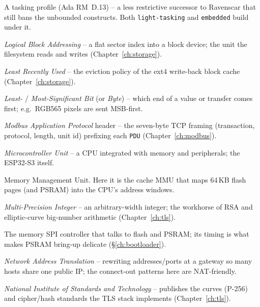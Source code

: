 \begin{description}[style=nextline, leftmargin=0pt]
\item[Jorvik] A tasking profile (Ada RM~D.13) -- a less restrictive successor to
  Ravenscar that still bans the unbounded constructs. Both \texttt{light-tasking}
  and \texttt{embedded} build under it.

\item[LBA] \emph{Logical Block Addressing} -- a flat sector index into a block device; the unit the filesystem reads and writes (Chapter~\ref{ch:storage}).

\item[LRU] \emph{Least Recently Used} -- the eviction policy of the ext4 write-back block cache (Chapter~\ref{ch:storage}).

\item[LSB / MSB] \emph{Least-} / \emph{Most-Significant Bit} (or \emph{Byte}) -- which end of a value or transfer comes first; e.g.\ RGB565 pixels are sent MSB-first.

\item[MBAP] \emph{Modbus Application Protocol} header -- the seven-byte TCP framing (transaction, protocol, length, unit id) prefixing each \texttt{PDU} (Chapter~\ref{ch:modbus}).

\item[MCU] \emph{Microcontroller Unit} -- a CPU integrated with memory and peripherals; the ESP32-S3 itself.

\item[MMU] Memory Management Unit. Here it is the cache MMU that maps 64\,KB flash
  pages (and PSRAM) into the CPU's address windows.

\item[MPI] \emph{Multi-Precision Integer} -- an arbitrary-width integer; the workhorse of RSA and elliptic-curve big-number arithmetic (Chapter~\ref{ch:tls}).

\item[MSPI] The memory SPI controller that talks to flash and PSRAM; its timing
  is what makes PSRAM bring-up delicate (\S\ref{ch:bootloader}).

\item[NAT] \emph{Network Address Translation} -- rewriting addresses/ports at a gateway so many hosts share one public IP; the connect-out patterns here are NAT-friendly.

\item[NIST] \emph{National Institute of Standards and Technology} -- publishes the curves (P-256) and cipher/hash standards the TLS stack implements (Chapter~\ref{ch:tls}).


\end{description}
